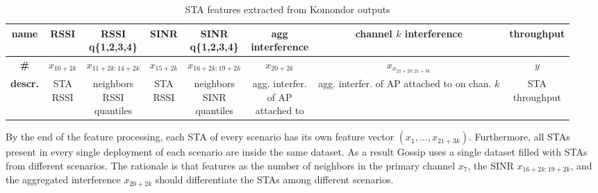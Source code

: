 \documentclass{article}
\begin{document}
\begin{table}[h]
    \label{table:output}
    \centering
    \caption{STA features extracted from Komondor outputs}
    \begin{adjustbox}{max width=\textwidth}
    \begin{tabular}{| c || c | c | c | c | c | c | c |}
        \hline
        \textbf{name} & RSSI & \makecell{RSSI \\q\{1,2,3,4\}} & SINR & \makecell{SINR\\q\{1,2,3,4\}} & \makecell{agg\\interference} & \makecell{channel $k$\\interference} & throughput\\ \hline
        \textbf{\#} & $x_{10+2k}$ & $x_{11+2k:14+2k}$ & $x_{15+2k}$ & $x_{16+2k:19+2k}$ & $x_{20+2k}$ & $x_{x_{21+2k:21+3k}}$ & $y$\\ \hline
        \textbf{descr.} & \makecell{STA\\RSSI} & \makecell{neighbors\\RSSI\\quantiles} & \makecell{STA\\RSSI} & \makecell{neighbors\\SINR\\quantiles} & \makecell{agg. interfer.\\of AP\\attached to} & \makecell{agg. interfer.\\of AP attached\\to on chan. $k$} & \makecell{STA\\throughput} \\ \hline

    \end{tabular}
    \end{adjustbox}
\end{table}

By the end of the feature processing, each STA
of every scenario has its own feature vector
$(x_1, \dots, x_{21+3k})$. Furthermore, all 
STAs present in every single deployment of each
scenario are inside the same dataset.
As a result Gossip uses a single dataset filled
with STAs from different scenarios. The rationale
is that features as the number of neighbors in
the primary channel $x_7$, the SINR $x_{16+2k:19+2k}$,
and the aggregated interference $x_{20+2k}$ should
differentiate the STAs among different scenarios.
\end{document}
